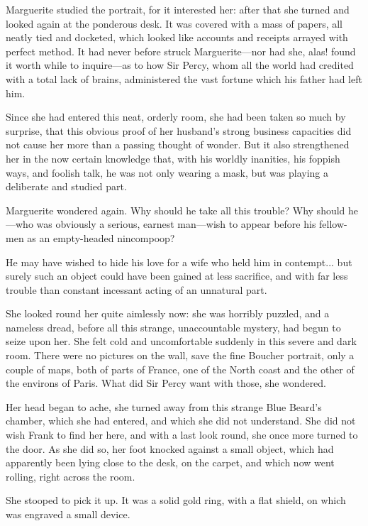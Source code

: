 \documentclass[paper=a5,BCOR=7mm,twoside,DIV=calc,12pt,usegeometry,chapterprefix,endperiod,headings=big]{scrbook}
\begin{document}
Marguerite studied the portrait, for it interested her: after that she turned and looked again at the ponderous desk. It was covered with a mass of papers, all neatly tied and docketed, which looked like accounts and receipts arrayed with perfect method. It had never before struck Marguerite---nor had she, alas! found it worth while to inquire---as to how Sir Percy, whom all the world had credited with a total lack of brains, administered the vast fortune which his father had left him.

Since she had entered this neat, orderly room, she had been taken so much by surprise, that this obvious proof of her husband's strong business capacities did not cause her more than a passing thought of wonder. But it also strengthened her in the now certain knowledge that, with his worldly inanities, his foppish ways, and foolish talk, he was not only wearing a mask, but was playing a deliberate and studied part.

Marguerite wondered again. Why should he take all this trouble? Why should he---who was obviously a serious, earnest man---wish to appear before his fellow-men as an empty-headed nincompoop?

He may have wished to hide his love for a wife who held him in contempt... but surely such an object could have been gained at less sacrifice, and with far less trouble than constant incessant acting of an unnatural part.

She looked round her quite aimlessly now: she was horribly puzzled, and a nameless dread, before all this strange, unaccountable mystery, had begun to seize upon her. She felt cold and uncomfortable suddenly in this severe and dark room. There were no pictures on the wall, save the fine Boucher portrait, only a couple of maps, both of parts of France, one of the North coast and the other of the environs of Paris. What did Sir Percy want with those, she wondered.

Her head began to ache, she turned away from this strange Blue Beard's chamber, which she had entered, and which she did not understand. She did not wish Frank to find her here, and with a last look round, she once more turned to the door. As she did so, her foot knocked against a small object, which had apparently been lying close to the desk, on the carpet, and which now went rolling, right across the room.

She stooped to pick it up. It was a solid gold ring, with a flat shield, on which was engraved a small device.
\end{document}
